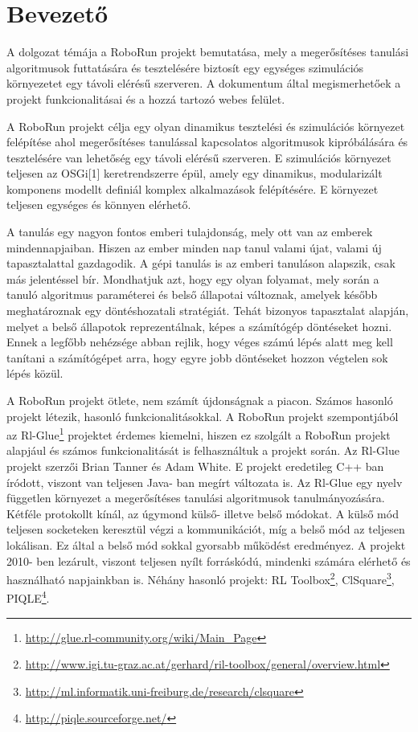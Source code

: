\chapter{Bevezető}\label{ch:BEVEZET}
	A dolgozat témája a RoboRun projekt bemutatása, mely a megerősítéses tanulási algoritmusok futtatására és tesztelésére biztosít egy egységes szimulációs környezetet egy távoli elérésű szerveren. A dokumentum által megismerhetőek a projekt funkcionalitásai és a hozzá tartozó webes felület.

	A RoboRun projekt célja egy olyan dinamikus tesztelési és szimulációs környezet felépítése ahol megerősítéses tanulással kapcsolatos algoritmusok kipróbálására és tesztelésére van lehetőség egy távoli elérésű szerveren. E szimulációs környezet teljesen az OSGi[1] keretrendszerre épül, amely egy dinamikus, modularizált komponens modellt definiál komplex alkalmazások felépítésére. E környezet teljesen egységes és könnyen elérhető. 
	
	A tanulás egy nagyon fontos emberi tulajdonság, mely ott van az emberek mindennapjaiban. Hiszen az ember minden nap tanul valami újat, valami új tapasztalattal gazdagodik. A gépi tanulás is az emberi tanuláson alapszik, csak más jelentéssel bír. Mondhatjuk azt, hogy egy olyan folyamat, mely során a tanuló algoritmus paraméterei és belső állapotai változnak, amelyek később meghatároznak egy döntéshozatali stratégiát. Tehát bizonyos tapasztalat alapján, melyet a belső állapotok reprezentálnak, képes a számítógép döntéseket hozni. Ennek a legfőbb nehézsége abban rejlik, hogy véges számú lépés alatt meg kell tanítani a számítógépet arra, hogy egyre jobb döntéseket hozzon végtelen sok lépés közül.
	
	A RoboRun projekt ötlete, nem számít újdonságnak a piacon. Számos hasonló projekt létezik, hasonló funkcionalitásokkal. A RoboRun projekt szempontjából az Rl-Glue\footnote{\href {http://glue.rl-community.org/wiki/Main_Page}{http://glue.rl-community.org/wiki/Main_Page}} projektet érdemes kiemelni, hiszen ez szolgált a RoboRun projekt alapjául és számos funkcionalitását is felhasználtuk a projekt során. Az Rl-Glue projekt szerzői Brian Tanner és Adam White. E projekt eredetileg C++ ban íródott, viszont van teljesen Java- ban megírt változata is. Az Rl-Glue egy nyelv független környezet a megerősítéses tanulási algoritmusok tanulmányozására. Kétféle protokollt kínál, az úgymond külső- illetve belső módokat. A külső mód teljesen socketeken keresztül végzi a kommunikációt, míg a belső mód az teljesen lokálisan. Ez által a belső mód sokkal gyorsabb működést eredményez. A projekt 2010- ben lezárult, viszont teljesen nyílt forráskódú, mindenki számára elérhető és használható napjainkban is. Néhány hasonló projekt: RL Toolbox\footnote{\href {http://www.igi.tu-graz.ac.at/gerhard/ril-toolbox/general/overview.html}{http://www.igi.tu-graz.ac.at/gerhard/ril-toolbox/general/overview.html}}, ClSquare\footnote{\href {http://ml.informatik.uni-freiburg.de/research/clsquare}{http://ml.informatik.uni-freiburg.de/research/clsquare}}, PIQLE\footnote{\href{http://piqle.sourceforge.net/}{http://piqle.sourceforge.net/}}. 


